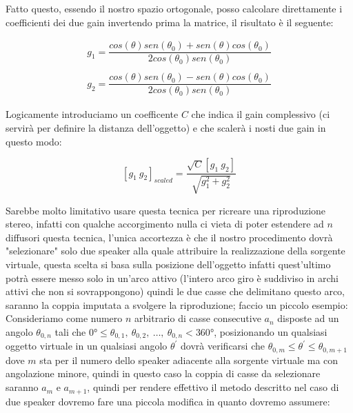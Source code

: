 \documentclass[12pt,a4paper]{report}
\begin{document}
Fatto questo, essendo il nostro spazio ortogonale, posso calcolare direttamente i coefficienti dei due gain invertendo prima la matrice, il risultato è il seguente:

\begin{equation}\begin{split}
g_1=\dfrac{cos(\theta) sen(\theta_0) + sen (\theta) cos(\theta_0)}{2 cos(\theta_0) sen(\theta_0)}\\ \\
g_2=\dfrac{cos(\theta) sen(\theta_0) - sen (\theta) cos(\theta_0)}{2 cos(\theta_0) sen(\theta_0)}
\end{split}
\label{eq:eeee}
\end{equation}

Logicamente introduciamo un coefficente $C$ che indica il gain complessivo (ci servirà per definire la distanza dell'oggetto) e che scalerà i nosti due gain in questo modo:

\begin{equation}
\left[g_1 \ g_2\right]_{scaled} = \dfrac{\sqrt{C} \left[ g_1 \ g_2 \right]}{\sqrt{g_1^2 + g_2^2}} 
\label{eq:ffff}
\end{equation}

Sarebbe molto limitativo usare questa tecnica per ricreare una riproduzione stereo, infatti con qualche accorgimento nulla ci vieta di poter estendere ad $n$ diffusori questa tecnica, l'unica accortezza è che il nostro procedimento dovrà "selezionare" solo due speaker alla quale attribuire la realizzazione della sorgente virtuale, questa scelta si basa sulla posizione dell'oggetto infatti quest'ultimo potrà essere messo solo in un'arco attivo (l'intero arco giro è suddiviso in archi attivi che non si sovrappongono) quindi le due casse che delimitano questo arco, saranno la coppia imputata a svolgere la riproduzione; faccio un piccolo esempio:\\

Consideriamo come numero $n$ arbitrario di casse consecutive $a_n$ disposte ad un angolo $\theta_{0,n}$ tali che $0°\leq \theta_{0,1},\ \theta_{0,2},\ \ldots,\ \theta_{0,n} <360°$, posizionando un qualsiasi oggetto virtuale in un qualsiasi angolo $\theta^{\prime}$ dovrà verificarsi che $\theta_{0,m}\leq \theta^{\prime} \leq \theta_{0,m+1}$ dove $m$ sta per il numero dello speaker adiacente alla sorgente virtuale ma con angolazione minore, quindi in questo caso la coppia di casse da selezionare saranno $a_m$ e $a_{m+1}$, quindi per rendere effettivo il metodo descritto nel caso di due speaker dovremo fare una piccola modifica in quanto dovremo assumere: 
\end{document}

